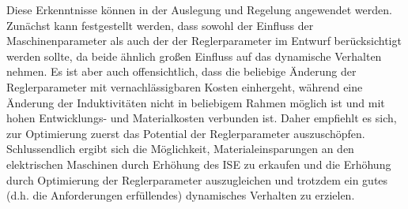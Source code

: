 Diese Erkenntnisse können in der Auslegung und Regelung angewendet werden. Zunächst kann festgestellt werden, dass sowohl der Einfluss der Maschinenparameter als auch der der Reglerparameter im Entwurf berücksichtigt werden sollte, da beide ähnlich großen Einfluss auf das dynamische Verhalten nehmen. Es ist aber auch offensichtlich, dass die beliebige Änderung der Reglerparameter mit vernachlässigbaren Kosten einhergeht, während eine Änderung der Induktivitäten nicht in beliebigem Rahmen möglich ist und mit hohen Entwicklungs- und Materialkosten verbunden ist. Daher empfiehlt es sich, zur Optimierung zuerst das Potential der Reglerparameter auszuschöpfen. Schlussendlich ergibt sich die Möglichkeit, Materialeinsparungen an den elektrischen Maschinen durch Erhöhung des ISE zu erkaufen und die Erhöhung durch Optimierung der Reglerparameter auszugleichen und trotzdem ein gutes (d.h. die Anforderungen erfüllendes) dynamisches Verhalten zu erzielen.
